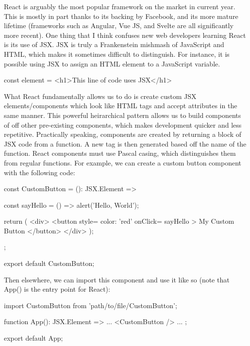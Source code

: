 \documentclass{article}
\begin{document}
React is arguably the most popular framework on the market in current year. This is mostly in part thanks to 
its backing by Facebook, and its more mature lifetime (frameworks such as Angular, Vue JS, and Svelte are all 
significantly more recent). One thing that I think confuses new web developers learning React is its use of 
JSX. JSX is truly a Frankenstein mishmash of JavaScript and HTML, which makes it sometimes difficult to 
distinguish. For instance, it is possible using JSX to assign an HTML element to a JavaScript variable.

\begin{tslst}

const element = <h1>This line of code uses JSX</h1>

\end{tslst}

What React fundamentally allows us to do is create custom JSX elements/components which look like HTML tags 
and accept attributes in the same manner. This powerful heirarchical pattern allows us to build components of 
off other pre-existing components, which makes development quicker and less repetitive. Practically speaking, 
components are created by returning a block of JSX code from a function. A new tag is then generated based off 
the name of the function. React components must use Pascal casing, which distinguishes them from regular 
functions. For example, we can create a custom button component with the following code:

\begin{tslst}

const CustomButton = (): JSX.Element => {
    const sayHello = () => {
        alert('Hello, World');
    }

    return (
        <div>
            <button 
                style={ color: 'red' }
                onClick={ sayHello }
            >
                My Custom Button
            </button>
        </div>
    ); 
};

export default CustomButton;

\end{tslst}

Then elsewhere, we can import this component and use it like so (note that App() is the entry point for React):

\begin{tslst}

import CustomButton from 'path/to/file/CustomButton';

function App(): JSX.Element => {
    ...
    <CustomButton />
    ...
};

export default App;

\end{tslst}
\end{document}
